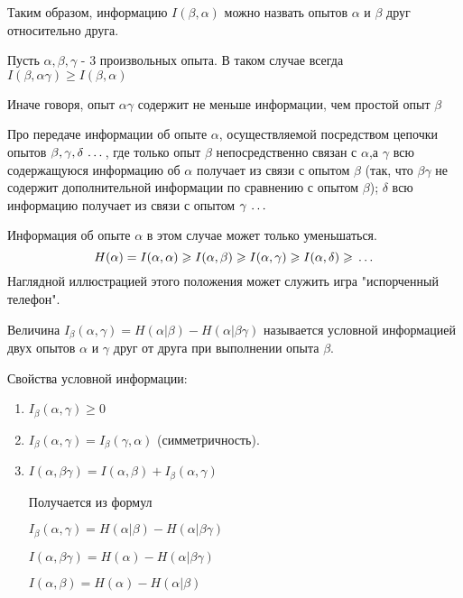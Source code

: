 ﻿\documentclass[a4paper,12pt]{report}
\begin{document}
	Таким образом, информацию $I(\beta,\alpha)$ можно назвать  опытов $\alpha$ и $\beta$ друг относительно друга.
	
	Пусть $\alpha, \beta, \gamma$ - 3 произвольных опыта. В таком случае всегда $I(\beta,\alpha\gamma) \ge I(\beta,\alpha)$
	
	Иначе говоря, опыт $\alpha\gamma$ содержит не меньше информации, чем простой опыт $\beta$
	 
	Про  передаче информации об опыте $\alpha$, осуществляемой посредством цепочки опытов $\beta, \gamma, \delta \,\ldots\,$, где только опыт $\beta$ непосредственно связан с $\alpha$,а $\gamma$ всю содержащуюся информацию об $\alpha$ получает из связи с опытом $\beta$ (так, что $\beta\gamma$ не содержит дополнительной информации по сравнению с опытом $\beta$); $\delta$ всю информацию получает из связи с опытом $\gamma \,\ldots\,$
	 
	Информация об опыте $\alpha$ в этом случае может только уменьшаться. 
	$$
	  H(\alpha) = I(\alpha,\alpha) 
	              \geqslant I(\alpha,\beta)
	              \geqslant I(\alpha,\gamma)
	              \geqslant I(\alpha,\delta)
	              \geqslant \,\ldots\,
	$$
	Наглядной иллюстрацией этого положения может служить игра "испорченный телефон".
	 	 
	Величина $I_\beta(\alpha,\gamma) = H(\alpha|\beta) - H(\alpha|\beta\gamma)$ называется условной информацией двух опытов $\alpha$ и $\gamma$ друг от друга при выполнении опыта $\beta$.
	
	Свойства условной информации:


	\begin{enumerate}
	
	\item	$I_\beta(\alpha,\gamma) \ge 0$
	
	\item	$I_\beta(\alpha,\gamma) = I_\beta(\gamma,\alpha)$ (симметричность).

	\item	$I(\alpha,\beta\gamma) = I(\alpha,\beta) + I_\beta(\alpha,\gamma)$
	
		Получается из формул 
		
		$I_\beta(\alpha,\gamma) =  H(\alpha|\beta) - H(\alpha|\beta\gamma)$
	
		$I(\alpha,\beta\gamma) = H(\alpha) - H(\alpha|\beta\gamma)$
		
		$I(\alpha,\beta) = H(\alpha) - H(\alpha|\beta)$
	
	\end{enumerate}	
\end{document}
